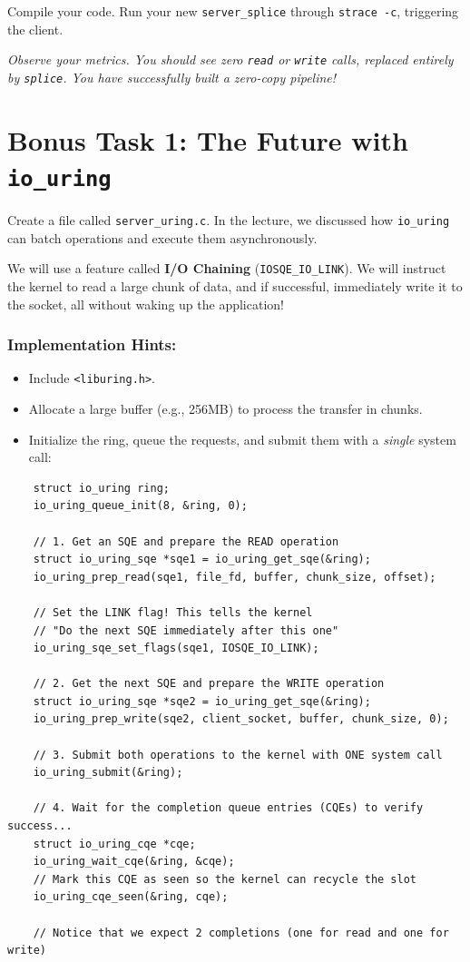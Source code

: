\documentclass[11pt, a4paper]{article}
\begin{document}
Compile your code. Run your new \texttt{server\_splice} through \texttt{strace -c}, triggering the client. 

\textit{Observe your metrics. You should see zero \texttt{read} or \texttt{write} calls, replaced entirely by \texttt{splice}. You have successfully built a zero-copy pipeline!}

\section*{Bonus Task 1: The Future with \texttt{io\_uring}}
Create a file called \texttt{server\_uring.c}. In the lecture, we discussed how \texttt{io\_uring} can batch operations and execute them asynchronously. 

We will use a feature called \textbf{I/O Chaining} (\texttt{IOSQE\_IO\_LINK}). We will instruct the kernel to read a large chunk of data, and if successful, immediately write it to the socket, all without waking up the application!

\subsubsection*{Implementation Hints:}
\begin{itemize}
    \item Include \texttt{<liburing.h>}.
    \item Allocate a large buffer (e.g., 256MB) to process the transfer in chunks.
    \item Initialize the ring, queue the requests, and submit them with a \textit{single} system call:
\end{itemize}

\begin{verbatim}
    struct io_uring ring;
    io_uring_queue_init(8, &ring, 0);

    // 1. Get an SQE and prepare the READ operation
    struct io_uring_sqe *sqe1 = io_uring_get_sqe(&ring);
    io_uring_prep_read(sqe1, file_fd, buffer, chunk_size, offset);

    // Set the LINK flag! This tells the kernel
    // "Do the next SQE immediately after this one"
    io_uring_sqe_set_flags(sqe1, IOSQE_IO_LINK);

    // 2. Get the next SQE and prepare the WRITE operation
    struct io_uring_sqe *sqe2 = io_uring_get_sqe(&ring);
    io_uring_prep_write(sqe2, client_socket, buffer, chunk_size, 0);

    // 3. Submit both operations to the kernel with ONE system call
    io_uring_submit(&ring);

    // 4. Wait for the completion queue entries (CQEs) to verify success...
    struct io_uring_cqe *cqe;
    io_uring_wait_cqe(&ring, &cqe);
    // Mark this CQE as seen so the kernel can recycle the slot
    io_uring_cqe_seen(&ring, cqe);

    // Notice that we expect 2 completions (one for read and one for write)
\end{verbatim}
\end{document}
